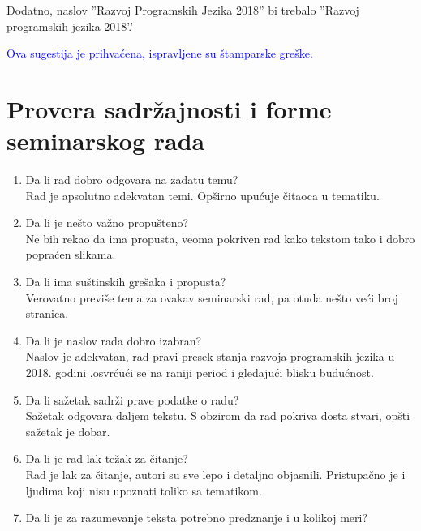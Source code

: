 \documentclass[a4paper]{report}
\newcommand{\odgovor}[1]{\textcolor{blue}{#1}}
\begin{document}
Dodatno, naslov ''Razvoj Programskih Jezika 2018'' bi trebalo ''Razvoj programskih jezika 2018'.'

\odgovor{Ova sugestija je prihvaćena, ispravljene su štamparske greške.}


\section{Provera sadržajnosti i forme seminarskog rada}

\begin{enumerate}
\item Da li rad dobro odgovara na zadatu temu?\\

Rad je apsolutno adekvatan temi. Opširno upućuje čitaoca u tematiku.

\item Da li je nešto važno propušteno?\\

Ne bih rekao da ima propusta, veoma pokriven rad kako tekstom tako i dobro popraćen slikama.

\item Da li ima suštinskih grešaka i propusta?\\

Verovatno previše tema za ovakav seminarski rad, pa otuda nešto veći broj stranica.

\item Da li je naslov rada dobro izabran?\\

Naslov je adekvatan, rad pravi presek stanja razvoja programskih jezika u 2018. godini ,osvrćući se na raniji period i gledajući blisku budućnost.

\item Da li sažetak sadrži prave podatke o radu?\\

Sažetak odgovara daljem tekstu. S obzirom da rad pokriva dosta stvari, opšti sažetak je dobar.

\item Da li je rad lak-težak za čitanje?\\

Rad je lak za čitanje, autori su sve lepo i detaljno objasnili. Pristupačno je i ljudima koji nisu upoznati toliko sa tematikom.

\item Da li je za razumevanje teksta potrebno predznanje i u kolikoj meri?\\


\end{enumerate}
\end{document}
